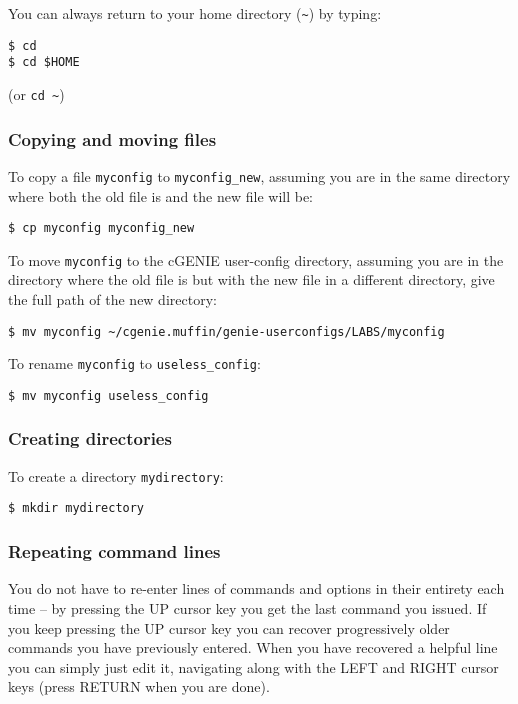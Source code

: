 \documentclass[11pt,fleqn]{book} %
\begin{document}
You can always return to your home directory (\texttt{\~}) by typing:
\begin{verbatim}
$ cd
$ cd $HOME
\end{verbatim}
(or \texttt{cd \~})

%
\subsubsection{Copying and moving files}

To copy a file \texttt{myconfig} to \texttt{myconfig\_new}, assuming you are in the same directory where both the old file is and the new file will be:
\begin{verbatim}
$ cp myconfig myconfig_new
\end{verbatim}

To move \texttt{myconfig} to the cGENIE user-config directory, assuming you are in the directory where the old file is but with the new file in a different directory, give the full path of the new directory:
\begin{verbatim}
$ mv myconfig ~/cgenie.muffin/genie-userconfigs/LABS/myconfig
\end{verbatim}

To rename \texttt{myconfig} to \texttt{useless\_config}:
\begin{verbatim}
$ mv myconfig useless_config
\end{verbatim}

%
\subsubsection{Creating directories}

To create a directory \texttt{mydirectory}:
\begin{verbatim}
$ mkdir mydirectory
\end{verbatim}

%
\subsubsection{Repeating command lines}

You do not have to re-enter lines of commands and options in their entirety each time – by pressing the UP cursor key you get the last command you issued. If you keep pressing the UP cursor key you can recover progressively older commands you have previously entered. When you have recovered a helpful line you can simply just edit it, navigating along with the LEFT and RIGHT cursor keys (press RETURN when you are done).
\end{document}
